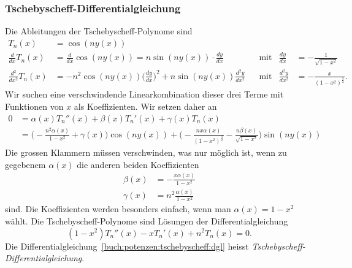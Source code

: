 \subsubsection{Tschebyscheff-Differentialgleichung}
Die Ableitungen der Tschebyscheff-Polynome sind
\begin{align*}
T_n(x)
&=
\cos (ny(x))
&&
&&
\\
\frac{d}{dx} T_n(x)
&=
\frac{d}{dx} \cos(ny(x))
=
n\sin(ny(x)) \cdot \frac{dy}{dx}
&
&\text{mit}&
\frac{dy}{dx}
&=
-\frac{1}{\sqrt{1-x^2}}
\\
\frac{d^2}{dx^2} T_n(x)
&=
-n^2\cos(ny(x)) \biggl(\frac{dy}{dx}\biggr)^2 + n\sin(ny(x)) \frac{d^2y}{dx^2}
&
&\text{mit}&
\frac{d^2y}{dx^2}
&=
-\frac{x}{(1-x^2)^{\frac32}}.
\end{align*}
Wir suchen eine verschwindende Linearkombination dieser drei Terme
mit Funktionen von $x$ als Koeffizienten.
Wir setzen daher an
\begin{align*}
0
&=
\alpha(x) T_n''(x)
+
\beta(x) T_n'(x)
+
\gamma(x) T_n(x)
\\
&=
\biggl(
-\frac{n^2\alpha(x)}{1-x^2}
+
\gamma(x)
\biggr)
\cos(ny(x))
+
\biggl(
-\frac{nx\alpha(x)}{(1-x^2)^{\frac32}}
-\frac{n\beta(x)}{\sqrt{1-x^2}}
\biggr)
\sin(ny(x))
\end{align*}
Die grossen Klammern müssen verschwinden, was nur möglich ist, wenn zu
gegebenem $\alpha(x)$ die anderen beiden Koeffizienten
\begin{align*}
\beta(x)  &=  -\frac{x\alpha(x)}{1-x^2} \\
\gamma(x) &= n^2 \frac{\alpha(x)}{1-x^2}
\end{align*}
sind.
Die Koeffizienten werden besonders einfach, wenn man $\alpha(x)=1-x^2$ wählt.
Die Tschebyscheff-Polynome sind Lösungen der Differentialgleichung
\begin{equation}
(1-x^2) T_n''(x) -x T_n'(x) +n^2 T_n(x) = 0.
\label{buch:potenzen:tschebyscheff:dgl}
\end{equation}
Die Differentialgleichung~\eqref{buch:potenzen:tschebyscheff:dgl}
heisst {\em Tschebyscheff-Differentialgleichung}.
%
%




